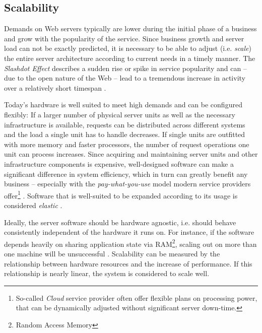 \subsection{Scalability}
Demands on Web servers typically are lower during the initial phase of a business and grow with the popularity of the service. Since business growth and server load can not be exactly predicted, it is necessary to be able to adjust (i.e. \textit{scale}) the entire server architecture according to current needs in a timely manner. The \textit{Slashdot Effect} describes a sudden rise or spike in service popularity and can -- due to the open nature of the Web -- lead to a tremendous increase in activity over a relatively short timespan \cite[p. 1]{Drolia2010}. 

Today's hardware is well suited to meet high demands and can be configured flexibly: If a larger number of physical server units as well as the necessary infrastructure is available, requests can be distributed across different systems and the load a single unit has to handle decreases. If single units are outfitted with more memory and faster processors, the number of request operations one unit can process increases. Since acquiring and maintaining server units and other infrastructure components is expensive, well-designed software can make a significant difference in system efficiency, which in turn can greatly benefit any business -- especially with the \textit{pay-what-you-use} model modern service providers offer\footnote{So-called \textit{Cloud} service provider often offer flexible plans on processing power, that can be dynamically adjusted without significant server down-time.} \cite[p. 11]{Hughes-Croucher2012}. Software that is well-suited to be expanded according to its usage is considered \textit{elastic} \cite{reactive}.

Ideally, the server software should be hardware agnostic, i.e. should behave consistently independent of the hardware it runs on. For instance, if the software depends heavily on sharing application state via RAM\footnote{Random Access Memory}, scaling out on more than one machine will be unsuccessful \cite{Veal2007}. Scalability can be measured by the relationship between hardware resources and the increase of performance. If this relationship is nearly linear, the system is considered to scale well.

